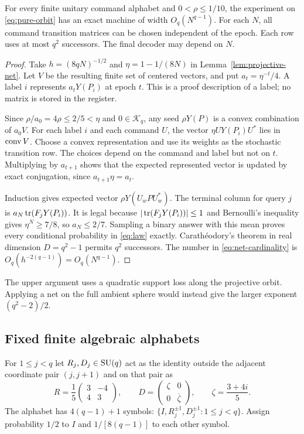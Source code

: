 \begin{theorem}
\label{thm:projective-upper}
For every finite unitary command alphabet and $0<\rho\le1/10$, the
experiment on \eqref{eq:pure-orbit} has an exact machine of width
$O_q(N^{q-1})$. For each $N$, all command transition matrices can be
chosen independent of the epoch. Each row uses at most $q^2$ successors.
The final decoder may depend on $N$.
\end{theorem}
\begin{proof}
Take $h=(8qN)^{-1/2}$ and $\eta=1-1/(8N)$ in
Lemma~\ref{lem:projective-net}. Let $V$ be the resulting finite set of
centered vectors, and put $a_t=\eta^{-t}/4$. A label $i$ represents
$a_tY(P_i)$ at epoch $t$. This is a proof description of a label;
no matrix is stored in the register.

Since $\rho/a_0=4\rho\le2/5<\eta$ and $0\in\mathcal K_q$,
any seed $\rho Y(P)$ is a convex combination of $a_0V$.
For each label $i$ and each command $U$, the vector
$\eta UY(P_i)U^*$ lies in $\operatorname{conv} V$. Choose a convex representation
and use its weights as the stochastic transition row. The choices depend
on the command and label but not on $t$. Multiplying by $a_{t+1}$
shows that the expected represented vector is updated by exact
conjugation, since $a_{t+1}\eta=a_t$.

Induction gives expected vector $\rho Y(U_wPU_w^*)$. The terminal
column for query $j$ is $a_N\operatorname{tr}(F_jY(P_i))$. It is legal because
$|\operatorname{tr}(F_jY(P_i))|\le1$ and Bernoulli's inequality gives
$\eta^N\ge7/8$, so $a_N\le2/7$. Sampling a binary answer with this
mean proves every conditional probability in \eqref{eq:law} exactly.
Carath\'eodory's theorem in real dimension $D=q^2-1$ permits $q^2$
successors. The number in \eqref{eq:net-cardinality} is
$O_q(h^{-2(q-1)})=O_q(N^{q-1})$.
\end{proof}
The upper argument uses a quadratic support loss along the projective
orbit. Applying a net on the full ambient sphere would instead give
the larger exponent $(q^2-2)/2$.

\subsection{Fixed finite algebraic alphabets}
For $1\le j<q$ let $R_j,D_j\in\operatorname{SU}(q)$ act as the identity outside
the adjacent coordinate pair $(j,j+1)$ and on that pair as
\begin{equation}\label{eq:adjacent-gates}
 R=\frac15\begin{pmatrix}3&-4\\4&3\end{pmatrix},\qquad
 D=\begin{pmatrix}\zeta&0\\0&\overline\zeta\end{pmatrix},\qquad
 \zeta=\frac{3+4i}{5}.
\end{equation}
The alphabet has $4(q-1)+1$ symbols:
$\{I,R_j^{\pm1},D_j^{\pm1}:1\le j<q\}$.
Assign probability $1/2$ to $I$ and $1/[8(q-1)]$ to each other symbol.

